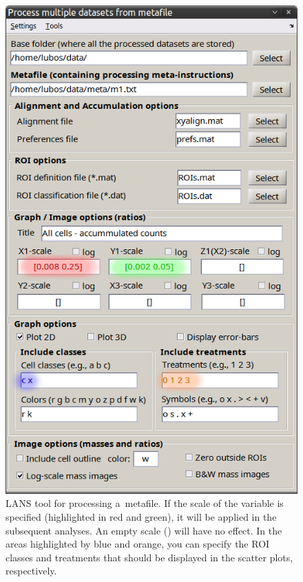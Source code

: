 \begin{figure}[!ht]
\centering
\includegraphics[scale=0.5]{figs3/LANS-process-metafile}
\caption{\label{fig:process-metafile}%
LANS tool for processing a~metafile. If the scale of the variable is specified (highlighted in red and green), it will be applied in the subsequent analyses. An empty scale (\ttt{[]}) will have no effect. In the areas highlighted by blue and orange, you can specify the ROI classes and treatments that should be displayed in the scatter plots, respectively.}
\end{figure}


